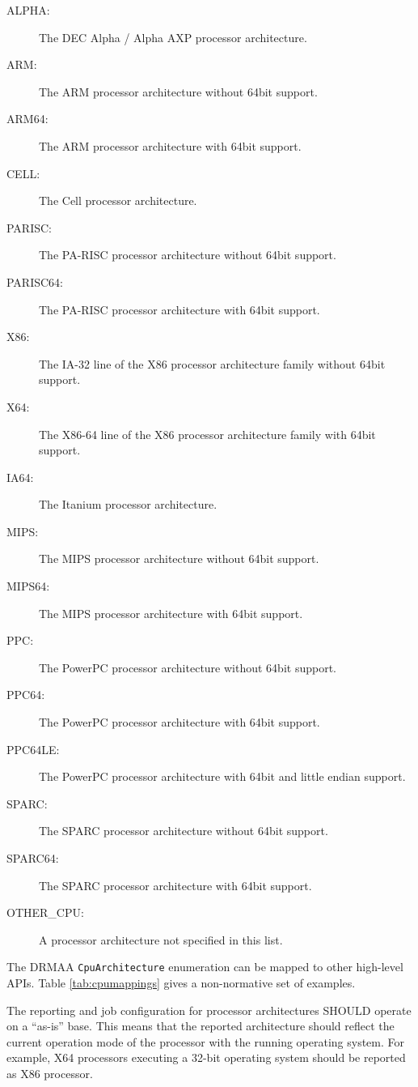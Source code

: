 \documentclass{article}
\newcommand{\h}[1]{\lstinline|#1|}
\begin{document}
\begin{description}
\item[ALPHA:] The DEC Alpha / Alpha AXP processor architecture.
\item[ARM:] The ARM processor architecture without 64bit support.
\item[ARM64:] The ARM processor architecture with 64bit support.
\item[CELL:] The Cell processor architecture.
\item[PARISC:] The PA-RISC processor architecture without 64bit support.
\item[PARISC64:] The PA-RISC processor architecture with 64bit support.
\item[X86:] The IA-32 line of the X86 processor architecture family without 64bit support.
\item[X64:] The X86-64 line of the X86 processor architecture family with 64bit support.
\item[IA64:] The Itanium processor architecture.
\item[MIPS:] The MIPS processor architecture without 64bit support.
\item[MIPS64:] The MIPS processor architecture with 64bit support.
\item[PPC:] The PowerPC processor architecture without 64bit support.
\item[PPC64:] The PowerPC processor architecture with 64bit support.
\item[PPC64LE:] The PowerPC processor architecture with 64bit and little endian support.
\item[SPARC:] The SPARC processor architecture without 64bit support.
\item[SPARC64:] The SPARC processor architecture with 64bit support.
\item[OTHER\_CPU:] A processor architecture not specified in this list.
\end{description}

The DRMAA \h{CpuArchitecture} enumeration can be mapped to other high-level APIs. Table \ref{tab:cpumappings} gives a non-normative set of examples.

The reporting and job configuration for processor architectures SHOULD operate on a \enquote{as-is} base. This means that the reported architecture should reflect the current operation mode of the processor with the running operating system. For example, X64 processors executing a 32-bit operating system should be reported as X86 processor.
\end{document}
